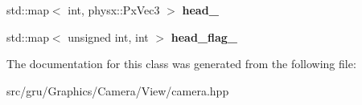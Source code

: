 \begin{DoxyCompactItemize}
\item 
\hypertarget{classneb_1_1camera_1_1camera_ad7207f50c2cfe3402fa57334f7557d03}{std\-::map$<$ int, physx\-::\-Px\-Vec3 $>$ {\bfseries head\-\_\-}}\label{classneb_1_1camera_1_1camera_ad7207f50c2cfe3402fa57334f7557d03}

\item 
\hypertarget{classneb_1_1camera_1_1camera_a011e06042be1b866b098f91ff2413921}{std\-::map$<$ unsigned int, int $>$ {\bfseries head\-\_\-flag\-\_\-}}\label{classneb_1_1camera_1_1camera_a011e06042be1b866b098f91ff2413921}

\end{DoxyCompactItemize}


\-The documentation for this class was generated from the following file\-:\begin{DoxyCompactItemize}
\item 
src/gru/\-Graphics/\-Camera/\-View/camera.\-hpp\end{DoxyCompactItemize}
